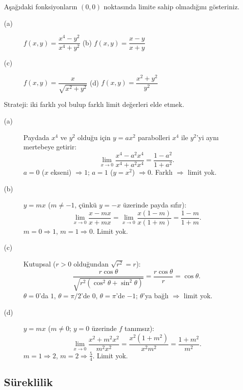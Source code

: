 \begin{soru}
Aşağıdaki fonksiyonların $(0,0)$ noktasında limite sahip olmadığını gösteriniz.
\begin{description}
  \item[(a)] $f(x,y)=\dfrac{x^4-y^2}{x^4+y^2}$ \qquad (b) $f(x,y)=\dfrac{x-y}{x+y}$
  \item[(c)] $f(x,y)=\dfrac{x}{\sqrt{x^2+y^2}}$ \qquad (d) $f(x,y)=\dfrac{x^2+y^2}{y^2}$
\end{description}
\end{soru}
\begin{cevap}
Strateji: iki farklı yol bulup farklı limit değerleri elde etmek.
\begin{description}
  \item[(a)] Paydada $x^4$ ve $y^2$ olduğu için $y=ax^2$ parabolleri $x^4$ ile $y^2$'yi aynı mertebeye getirir:
  \[
  \lim_{x\to0}\frac{x^4-a^2x^4}{x^4+a^2x^4}=\frac{1-a^2}{1+a^2}.
  \]
  $a=0$ ($x$ ekseni) $\Rightarrow1$; $a=1$ ($y=x^2$) $\Rightarrow0$. Farklı $\Rightarrow$ limit yok.
  \item[(b)] $y=mx$ ($m\neq-1$, çünkü $y=-x$ üzerinde payda sıfır):
  \[
  \lim_{x\to0}\frac{x-mx}{x+mx}=\lim_{x\to0}\frac{x(1-m)}{x(1+m)}=\frac{1-m}{1+m}.
  \]
  $m=0\Rightarrow1$, $m=1\Rightarrow0$. Limit yok.
  \item[(c)] Kutupsal ($r>0$ olduğundan $\sqrt{r^2}=r$):
  \[
  \frac{r\cos\theta}{\sqrt{r^2(\cos^2\theta+\sin^2\theta)}}=\frac{r\cos\theta}{r}=\cos\theta .
  \]
  $\theta=0$'da $1$, $\theta=\pi/2$'de $0$, $\theta=\pi$'de $-1$; $\theta$'ya bağlı $\Rightarrow$ limit yok.
  \item[(d)] $y=mx$ ($m\neq0$; $y=0$ üzerinde $f$ tanımsız):
  \[
  \lim_{x\to0}\frac{x^2+m^2x^2}{m^2x^2}=\frac{x^2(1+m^2)}{x^2m^2}=\frac{1+m^2}{m^2}.
  \]
  $m=1\Rightarrow2$, $m=2\Rightarrow\frac54$. Limit yok.
\end{description}
\end{cevap}

\subsection{Süreklilik}

